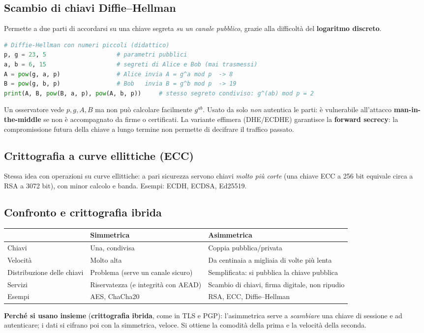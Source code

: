 \subsection{Scambio di chiavi Diffie--Hellman}
Permette a due parti di accordarsi su una chiave segreta \emph{su un canale pubblico}, grazie alla difficoltà del \textbf{logaritmo discreto}.
\begin{lstlisting}[language=Python, caption={Diffie-Hellman con numeri piccoli (didattico)}]
# Diffie-Hellman con numeri piccoli (didattico)
p, g = 23, 5                    # parametri pubblici
a, b = 6, 15                    # segreti di Alice e Bob (mai trasmessi)
A = pow(g, a, p)                # Alice invia A = g^a mod p  -> 8
B = pow(g, b, p)                # Bob   invia B = g^b mod p  -> 19
print(A, B, pow(B, a, p), pow(A, b, p))     # stesso segreto condiviso: g^(ab) mod p = 2
\end{lstlisting}
Un osservatore vede $p, g, A, B$ ma non può calcolare facilmente $g^{ab}$. Usato da solo \emph{non} autentica le parti: è vulnerabile all'attacco \textbf{man-in-the-middle} se non è accompagnato da firme o certificati. La variante effimera (DHE/ECDHE) garantisce la \textbf{forward secrecy}: la compromissione futura della chiave a lungo termine non permette di decifrare il traffico passato.

\subsection{Crittografia a curve ellittiche (ECC)}
Stessa idea con operazioni su curve ellittiche: a pari sicurezza servono chiavi \emph{molto più corte} (una chiave ECC a 256 bit equivale circa a RSA a 3072 bit), con minor calcolo e banda. Esempi: ECDH, ECDSA, Ed25519.

\subsection{Confronto e crittografia ibrida}
\begin{center}
\small
\begin{tabularx}{\textwidth}{@{}>{\raggedright\arraybackslash}p{3cm}XX@{}}
\toprule
 & \textbf{Simmetrica} & \textbf{Asimmetrica} \\
\midrule
Chiavi & Una, condivisa & Coppia pubblica/privata \\
Velocità & Molto alta & Da centinaia a migliaia di volte più lenta \\
Distribuzione delle chiavi & Problema (serve un canale sicuro) & Semplificata: si pubblica la chiave pubblica \\
Servizi & Riservatezza (e integrità con AEAD) & Scambio di chiavi, firma digitale, non ripudio \\
Esempi & AES, ChaCha20 & RSA, ECC, Diffie--Hellman \\
\bottomrule
\end{tabularx}
\end{center}
\textbf{Perché si usano insieme} (\textbf{crittografia ibrida}, come in TLS e PGP): l'asimmetrica serve a \emph{scambiare} una chiave di sessione e ad autenticare; i dati si cifrano poi con la simmetrica, veloce. Si ottiene la comodità della prima e la velocità della seconda.


